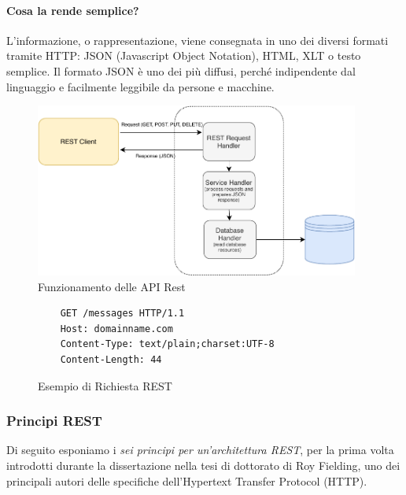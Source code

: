 \paragraph{Cosa la rende semplice?} L'informazione, o rappresentazione, viene consegnata in uno dei diversi formati tramite HTTP: JSON (Javascript Object Notation), HTML, XLT o testo semplice. Il formato JSON è uno dei più diffusi, perché indipendente dal linguaggio e facilmente leggibile da persone e macchine.
\begin{figure}[H]
    \centering
    \includegraphics[width=0.95\textwidth]{images/01_10_restapi.pdf}
    \caption{Funzionamento delle API Rest}
    \label{fig:api}
\end{figure}
\begin{figure}[H]
\begin{verbatim}
    GET /messages HTTP/1.1
    Host: domainname.com
    Content-Type: text/plain;charset:UTF-8
    Content-Length: 44
\end{verbatim}
\caption{Esempio di Richiesta REST}
\label{fig:restrequest}
\end{figure}

\subsubsection{Principi REST}
Di seguito esponiamo i \textit{sei principi per un'architettura REST}, per la prima volta introdotti durante la dissertazione nella tesi di dottorato di Roy Fielding, uno dei principali autori delle specifiche dell'Hypertext Transfer Protocol (HTTP). \cite{fielding:restprinciples}

